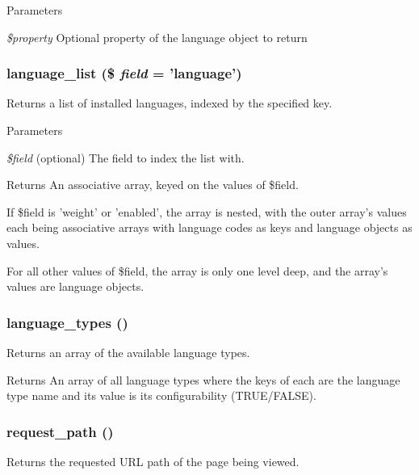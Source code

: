 \begin{DoxyParams}{Parameters}
\item[{\em \$property}]Optional property of the language object to return \end{DoxyParams}
\hypertarget{bootstrap_8inc_aec69f67dd1921a3b55d7f9de9034ecb4}{
\subsubsection[{language\_\-list}]{\setlength{\rightskip}{0pt plus 5cm}language\_\-list (\$ {\em field} = {\ttfamily 'language'})}}
\label{bootstrap_8inc_aec69f67dd1921a3b55d7f9de9034ecb4}
Returns a list of installed languages, indexed by the specified key.


\begin{DoxyParams}{Parameters}
\item[{\em \$field}](optional) The field to index the list with.\end{DoxyParams}
\begin{DoxyReturn}{Returns}
An associative array, keyed on the values of \$field.
\begin{DoxyItemize}
\item If \$field is 'weight' or 'enabled', the array is nested, with the outer array's values each being associative arrays with language codes as keys and language objects as values.
\item For all other values of \$field, the array is only one level deep, and the array's values are language objects. 
\end{DoxyItemize}
\end{DoxyReturn}
\hypertarget{bootstrap_8inc_ad541772a6e26f013b31257ee589979d5}{
\subsubsection[{language\_\-types}]{\setlength{\rightskip}{0pt plus 5cm}language\_\-types ()}}
\label{bootstrap_8inc_ad541772a6e26f013b31257ee589979d5}
Returns an array of the available language types.

\begin{DoxyReturn}{Returns}
An array of all language types where the keys of each are the language type name and its value is its configurability (TRUE/FALSE). 
\end{DoxyReturn}
\hypertarget{bootstrap_8inc_a58aae06c8c4282de3a6e292353bac1c0}{
\subsubsection[{request\_\-path}]{\setlength{\rightskip}{0pt plus 5cm}request\_\-path ()}}
\label{bootstrap_8inc_a58aae06c8c4282de3a6e292353bac1c0}
Returns the requested URL path of the page being viewed.

